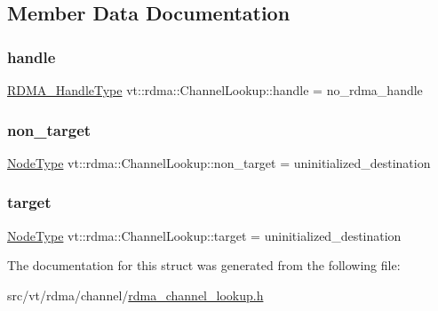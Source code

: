 \subsection{Member Data Documentation}
\mbox{\label{structvt_1_1rdma_1_1_channel_lookup_a02cd23701c295b73675c998d4e84c4b9}} 
\subsubsection{\texorpdfstring{handle}{handle}}
{\footnotesize\ttfamily \hyperlink{namespacevt_a10442579ec4e7ebef223818e64bcf908}{R\+D\+M\+A\+\_\+\+Handle\+Type} vt\+::rdma\+::\+Channel\+Lookup\+::handle = no\+\_\+rdma\+\_\+handle}

\mbox{\label{structvt_1_1rdma_1_1_channel_lookup_ae01c924a3a559f70dfda62b187989f51}} 
\subsubsection{\texorpdfstring{non\+\_\+target}{non\_target}}
{\footnotesize\ttfamily \hyperlink{namespacevt_a866da9d0efc19c0a1ce79e9e492f47e2}{Node\+Type} vt\+::rdma\+::\+Channel\+Lookup\+::non\+\_\+target = uninitialized\+\_\+destination}

\mbox{\label{structvt_1_1rdma_1_1_channel_lookup_a5fc6e66edbe73653e261246202d22b97}} 
\subsubsection{\texorpdfstring{target}{target}}
{\footnotesize\ttfamily \hyperlink{namespacevt_a866da9d0efc19c0a1ce79e9e492f47e2}{Node\+Type} vt\+::rdma\+::\+Channel\+Lookup\+::target = uninitialized\+\_\+destination}



The documentation for this struct was generated from the following file\+:\begin{DoxyCompactItemize}
\item 
src/vt/rdma/channel/\hyperlink{rdma__channel__lookup_8h}{rdma\+\_\+channel\+\_\+lookup.\+h}\end{DoxyCompactItemize}
